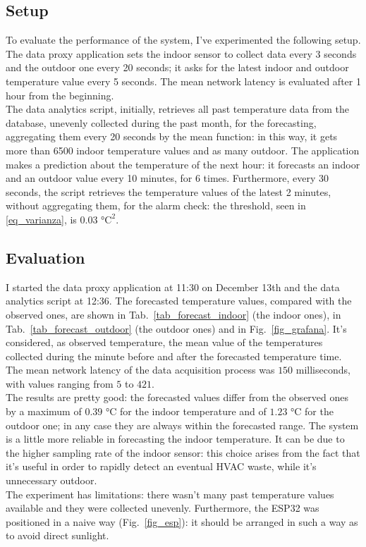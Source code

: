 \documentclass[conference]{IEEEtran}
\begin{document}
\subsection{Setup}
To evaluate the performance of the system, I've experimented the following setup.\\
The data proxy application sets the indoor sensor to collect data every 3 seconds and the outdoor one every 20 seconds; it asks for the latest indoor and outdoor temperature value every 5 seconds. The mean network latency is evaluated after 1 hour from the beginning.\\
The data analytics script, initially, retrieves all past temperature data from the database, unevenly collected during the past month, for the forecasting, aggregating them every 20 seconds by the mean function: in this way, it gets more than 6500 indoor temperature values and as many outdoor. The application makes a prediction about the temperature of the next hour: it forecasts an indoor and an outdoor value every 10 minutes, for 6 times. Furthermore, every 30 seconds, the script retrieves the temperature values of the latest 2 minutes, without aggregating them, for the alarm check: the threshold, seen in \eqref{eq_varianza}, is $0.03$ $\text{°C}^2$.

\subsection{Evaluation}
I started the data proxy application at 11:30 on December 13th and the data analytics script at 12:36. The forecasted temperature values, compared with the observed ones, are shown in Tab.~\ref{tab_forecast_indoor} (the indoor ones), in Tab.~\ref{tab_forecast_outdoor} (the outdoor ones) and in Fig.~\ref{fig_grafana}. It's considered, as observed temperature, the mean value  of the temperatures collected during the minute before and after the forecasted temperature time. The mean network latency of the data acquisition process was $150$ milliseconds, with values ranging from $5$ to $421$.\\
The results are pretty good: the forecasted values differ from the observed ones by a maximum of $0.39$ °C for the indoor temperature and of $1.23$ °C for the outdoor one; in any case they are always within the forecasted range. The system is a little more reliable in forecasting the indoor temperature. It can be due to the higher sampling rate of the indoor sensor: this choice arises from the fact that it's useful in order to rapidly detect an eventual HVAC waste, while it's unnecessary outdoor.\\
The experiment has limitations: there wasn't many past temperature values available and they were collected unevenly. Furthermore, the ESP32 was positioned in a naive way (Fig.~\ref{fig_esp}): it should be arranged in such a way as to avoid direct sunlight.
\end{document}
